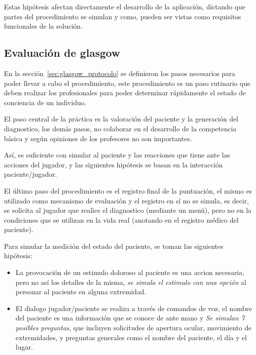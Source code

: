 Estas hipótesis afectan directamente el desarrollo de la aplicación, dictando
que partes del procedimiento se simulan y como, pueden ser vistas como
requisitos funcionales de la solución.

\subsection{Evaluación de glasgow}

En la sección~\ref{sec:glasgow_protocolo} se definieron los pasos necesarios
para poder llevar a cabo el procedimiento, este procedimiento es un paso
rutinario que deben realizar los profesionales para poder determinar rápidamente
el estado de conciencia de un individuo. 

El paso central de la práctica es la valoración del paciente y la generación del
diagnostico, los demás pasos, no colaborar en el desarrollo de la competencia
básica y según opiniones de los profesores no son importantes.

Así, es suficiente con simular al paciente y las reacciones que tiene ante las
acciones del jugador, y las siguientes hipótesis se basan en la interacción
paciente/jugador.

El último paso del procedimiento es el registro final de la puntuación, el mismo
es utilizado como mecanismo de evaluación y el registro en sí no se simula, es
decir, se solicita al jugador que realice el diagnostico (mediante un menú),
pero no en la condiciones que se utilizan en la vida real (anotando en el
registro médico del paciente).

Para simular la medición del estado del paciente, se toman las siguientes
hipótesis:

\begin{itemize}
    \item La provocación de un estimulo doloroso al paciente es una accion
        necesaria, pero no así los detalles de la misma, \emph{se simula el
            estimulo con una opción} al personar al paciente en alguna
        extremidad.
    \item El dialogo jugador/paciente se realiza a través de comandos de voz, el
        nombre del paciente es una información que se conoce de ante mano y
        \emph{Se simulan 7 posibles preguntas}, que incluyen solicitudes de
        apertura ocular, movimiento de extremidades, y preguntas generales como
        el nombre del paciente, el día y el lugar.
\end{itemize}


